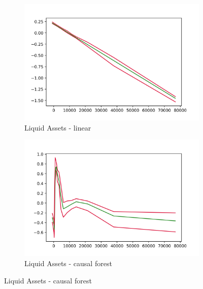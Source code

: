 \begin{figure}[h]
    \centering
    \begin{subfigure}{0.5\linewidth}
        \includegraphics[width=\linewidth]{figures/ALE/chTOTexp/spec3_linear_liqassii.png}
        \caption{Liquid Assets - linear}
    \end{subfigure}%
    \begin{subfigure}{0.5\linewidth}
        \includegraphics[width=\linewidth]{figures/ALE/chTOTexp/spec3_cf_liqassii.png}
        \caption{Liquid Assets - causal forest}
    \end{subfigure}


\end{figure}
